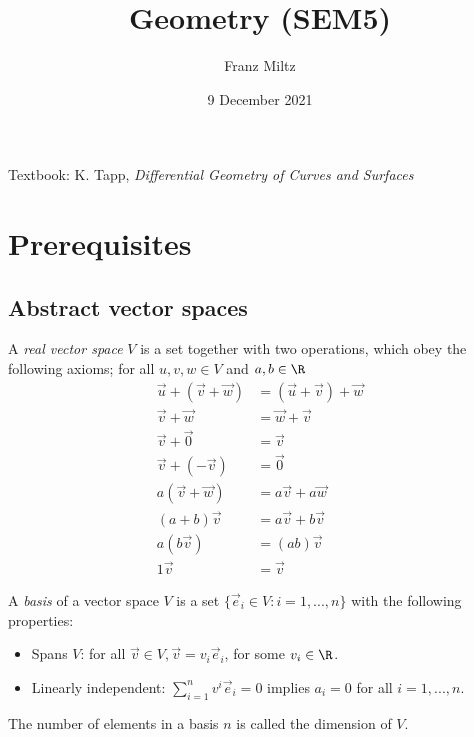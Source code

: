 \documentclass{article}
\begin{document}
\title{Geometry (SEM5)}
\author{Franz Miltz}
\date{9 December 2021}
\maketitle
\noindent Textbook: K. Tapp, \emph{Differential Geometry of Curves and Surfaces}
\tableofcontents
\pagebreak

\section{Prerequisites}

\subsection{Abstract vector spaces}

\begin{definition}[Notes 2.1]
	A \emph{real vector space} $V$ is a set together with two operations, which obey the following
	axioms; for all $u,v,w\in V$ and $a,b\in\R$
	\begin{align*}
		\vec u + (\vec v + \vec w) & = (\vec u + \vec v) + \vec w \\
		\vec v + \vec w            & = \vec w + \vec v            \\
		\vec v + \vec 0            & = \vec v                     \\
		\vec v + (-\vec v)         & = \vec 0                     \\
		a(\vec v + \vec w)         & = a\vec v + a\vec w          \\
		(a+b)\vec v                & = a\vec v + b\vec v          \\
		a(b\vec v)                 & = (ab)\vec v                 \\
		1\vec v                    & = \vec v
	\end{align*}
\end{definition}

\begin{definition}[Notes 2.3]
	A \emph{basis} of a vector space $V$ is a set $\{\vec e_i \in V : i = 1, ..., n\}$
	with the following properties:
	\begin{itemize}
		\item Spans $V$: for all $\vec v\in V, \vec v = v_i \vec e_i$, for some $v_i\in\R$.
		\item Linearly independent: $\sum_{i=1}^n v^i\vec e_i = 0$ implies $a_i = 0$ for all $i=1,...,n$.
	\end{itemize}
	The number of elements in a basis $n$ is called the dimension of $V$.
\end{definition}
\end{document}
